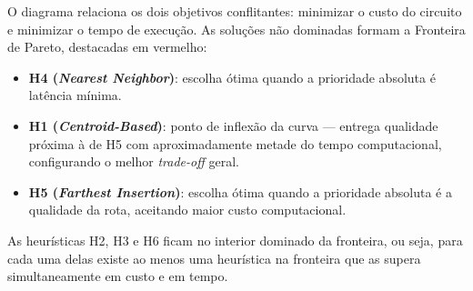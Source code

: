 \documentclass[12pt, a4paper]{article}
\begin{document}
O diagrama relaciona os dois objetivos conflitantes: minimizar o custo do circuito e
minimizar o tempo de execução. As soluções não dominadas formam a Fronteira de Pareto,
destacadas em vermelho:

\begin{itemize}
    \item \textbf{H4 (\textit{Nearest Neighbor})}: escolha ótima quando a prioridade
          absoluta é latência mínima.
    \item \textbf{H1 (\textit{Centroid-Based})}: ponto de inflexão da curva ---
          entrega qualidade próxima à de H5 com aproximadamente metade do tempo
          computacional, configurando o melhor \textit{trade-off} geral.
    \item \textbf{H5 (\textit{Farthest Insertion})}: escolha ótima quando a prioridade
          absoluta é a qualidade da rota, aceitando maior custo computacional.
\end{itemize}

As heurísticas H2, H3 e H6 ficam no interior dominado da fronteira, ou seja, para cada
uma delas existe ao menos uma heurística na fronteira que as supera simultaneamente em
custo e em tempo.



\end{document}
